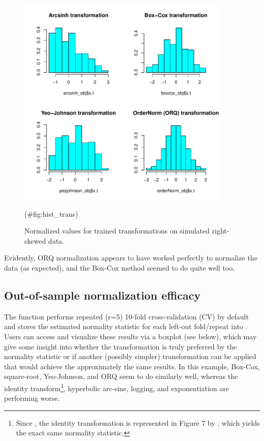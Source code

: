 \begin{Schunk}
\begin{figure}

{\centering \includegraphics[width=4in,height=4in]{figs/hist_trans-1} 

}

\caption[Normalized values for trained transformations on simulated right-skewed data]{Normalized values for trained transformations on simulated right-skewed data.}(\#fig:hist_trans)
\end{figure}
\end{Schunk}

Evidently, ORQ normalization appears to have worked perfectly to
normalize the data (as expected), and the Box-Cox method seemed to do
quite well too.

\hypertarget{out-of-sample-normalization-efficacy}{%
\subsection{Out-of-sample normalization
efficacy}\label{out-of-sample-normalization-efficacy}}

The  function performs repeated (r=5) 10-fold
cross-validation (CV) by default and stores the estimated normality
statistic for each left-out fold/repeat into
. Users can access and visualize these
results via a boxplot (see below), which may give some insight into
whether the transformation is truly preferred by the normality statistic
or if another (possibly simpler) transformation can be applied that
would achieve the approximately the same results. In this example,
Box-Cox, square-root, Yeo-Johnson, and ORQ seem to do similarly well,
whereas the identity
transform\footnote{Since , the identity transformation is represented in Figure 7 by , which yields the exact same normality statistic.},
hyperbolic arc-sine, logging, and exponentiation are performing worse.

